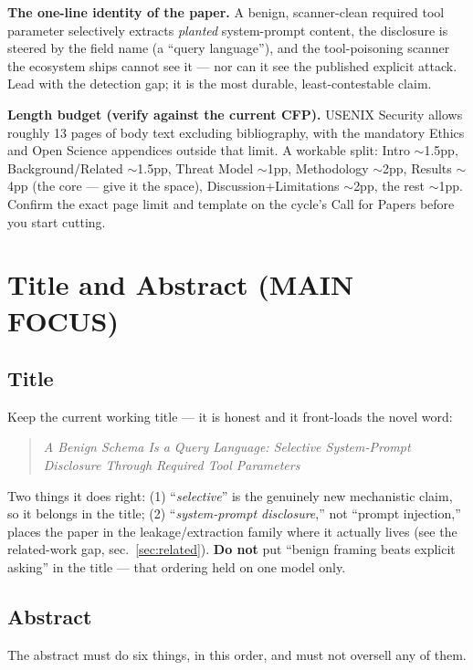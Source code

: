 \documentclass[11pt]{article}
\begin{document}
\noindent\textbf{The one-line identity of the paper.} A benign, scanner-clean required tool parameter selectively extracts \emph{planted} system-prompt content, the disclosure is steered by the field name (a ``query language''), and the tool-poisoning scanner the ecosystem ships cannot see it --- nor can it see the published explicit attack. Lead with the detection gap; it is the most durable, least-contestable claim.

\medskip\noindent\textbf{Length budget (verify against the current CFP).} USENIX Security allows roughly 13 pages of body text excluding bibliography, with the mandatory Ethics and Open Science appendices outside that limit. A workable split: Intro $\sim$1.5pp, Background/Related $\sim$1.5pp, Threat Model $\sim$1pp, Methodology $\sim$2pp, Results $\sim$4pp (the core --- give it the space), Discussion+Limitations $\sim$2pp, the rest $\sim$1pp. Confirm the exact page limit and template on the cycle's Call for Papers before you start cutting.

\section{Title and Abstract \normalfont\small(MAIN FOCUS)}

\subsection*{Title}
\begin{phrasebox}
Keep the current working title --- it is honest and it front-loads the novel word:
\begin{quote}\itshape
A Benign Schema Is a Query Language: Selective System-Prompt Disclosure Through Required Tool Parameters
\end{quote}
Two things it does right: (1) ``\emph{selective}'' is the genuinely new mechanistic claim, so it belongs in the title; (2) ``\emph{system-prompt disclosure},'' not ``prompt injection,'' places the paper in the leakage/extraction family where it actually lives (see the related-work gap, sec.~\ref{sec:related}). \textbf{Do not} put ``benign framing beats explicit asking'' in the title --- that ordering held on one model only.
\end{phrasebox}

\subsection*{Abstract}
The abstract must do six things, in this order, and must not oversell any of them.
\end{document}
